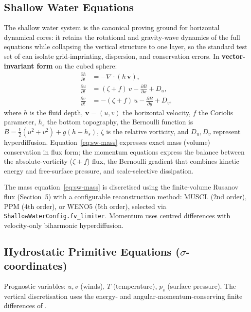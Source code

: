 \documentclass[11pt,a4paper]{article}
\newcommand{\pp}{\partial}
\newcommand{\half}{\tfrac{1}{2}}
\begin{document}
\subsection{Shallow Water Equations}

The shallow water system is the canonical proving ground for horizontal dynamical cores: it retains the rotational and gravity-wave dynamics of the full equations while collapsing the vertical structure to one layer, so the standard test set of \citet{Williamson1992} can isolate grid-imprinting, dispersion, and conservation errors.  In \textbf{vector-invariant form} on the cubed sphere:
\begin{align}
  \frac{\pp h}{\pp t} &= -\nabla\!\cdot\!(h\,\bm v), \label{eq:sw-mass}\\
  \frac{\pp u}{\pp t} &= (\zeta+f)\,v - \frac{\pp B}{\pp x} + D_u, \label{eq:sw-u}\\
  \frac{\pp v}{\pp t} &= -(\zeta+f)\,u - \frac{\pp B}{\pp y} + D_v, \label{eq:sw-v}
\end{align}
where $h$ is the fluid depth, $\bm v=(u,v)$ the horizontal velocity, $f$ the Coriolis parameter, $h_s$ the bottom topography, the Bernoulli function is $B=\half(u^2+v^2)+g(h+h_s)$, $\zeta$ is the relative vorticity, and $D_u,D_v$ represent hyperdiffusion.  Equation~\eqref{eq:sw-mass} expresses exact mass (volume) conservation in flux form; the momentum equations express the balance between the absolute-vorticity ($\zeta+f$) flux, the Bernoulli gradient that combines kinetic energy and free-surface pressure, and scale-selective dissipation.

The mass equation~\eqref{eq:sw-mass} is discretised using the finite-volume Rusanov flux (Section~5) with a configurable reconstruction method: MUSCL (2nd order), PPM (4th order), or WENO5 (5th order), selected via \texttt{ShallowWaterConfig.fv\_limiter}.  Momentum uses centred differences with velocity-only biharmonic hyperdiffusion.

\subsection{Hydrostatic Primitive Equations ($\sigma$-coordinates)}

Prognostic variables: $u,v$ (winds), $T$ (temperature), $p_s$ (surface pressure).  The vertical discretisation uses the energy- and angular-momentum-conserving finite differences of \citet{SimmonsBurridge1981}.
\end{document}
